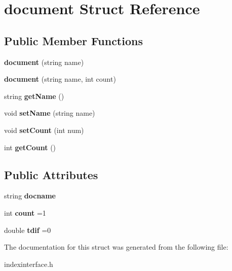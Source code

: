 \section{document Struct Reference}
\label{structdocument}
\subsection*{Public Member Functions}
\begin{DoxyCompactItemize}
\item 
{\bfseries document} (string name)\label{structdocument_a73102ad6433b782691866acc2b0f3445}

\item 
{\bfseries document} (string name, int count)\label{structdocument_acb86cbf4e1a0549888ec9edc0fa58253}

\item 
string {\bfseries get\+Name} ()\label{structdocument_a1a04e6dcf760b7fde063b3e1f68cc890}

\item 
void {\bfseries set\+Name} (string name)\label{structdocument_a4aca298655daebf017e0bb4c29dc5c1c}

\item 
void {\bfseries set\+Count} (int num)\label{structdocument_a1e82f4325b83f252511c93927beb8a18}

\item 
int {\bfseries get\+Count} ()\label{structdocument_a66b165da6c3013637aa5f63a9faef15a}

\end{DoxyCompactItemize}
\subsection*{Public Attributes}
\begin{DoxyCompactItemize}
\item 
string {\bfseries docname}\label{structdocument_a709e8f2cc77c7e1ef3e2764ea617bb5a}

\item 
int {\bfseries count} =1\label{structdocument_ac9a5775492799ee21c32a4c84aefaffc}

\item 
double {\bfseries tdif} =0\label{structdocument_a85580a39269bfeb2e22b1d7cd55c163c}

\end{DoxyCompactItemize}


The documentation for this struct was generated from the following file\+:\begin{DoxyCompactItemize}
\item 
indexinterface.\+h\end{DoxyCompactItemize}
